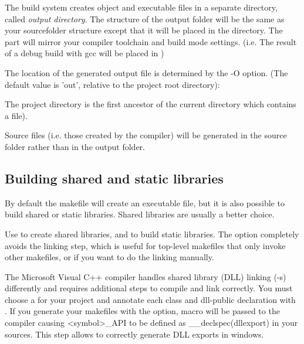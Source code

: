 The build system creates object and executable files in a separate directory, called
\textit{output directory}. The structure of the output folder will be the same as your
sourcefolder structure except that it will be placed in the  directory.
The  part will mirror your compiler toolchain and build mode settings.
(i.e. The result of a debug build with gcc will be placed in )


The location of the generated output file is determined by the -O option.
(The default value is 'out', relative to the project root directory):




\begin{note}
The project directory is the first ancestor of the current directory which
contains a  file).
\end{note}


\begin{note}
Source files (i.e. those created by the  compiler) will be generated in the
source folder rather than in the output folder.
\end{note}


\subsection{Building shared and static libraries}

By default the makefile will create an executable file, but it is also
possible to build shared or static libraries. Shared libraries
are usually a better choice.

Use  to create shared libraries, and 
to build static libraries. The  option completely avoids
the linking step, which is useful for top-level makefiles that only invoke
other makefiles, or if you want to do the linking manually.

\ifcommercial
\begin{note}
The Microsoft Visual C++ compiler handles shared library (DLL) linking (-s)
differently and requires additional steps to compile and link correctly.
You must choose a  for your project and annotate each class
and dll-public declaration with . If you generate your makefiles
with the  option,  macro will be passed to
the compiler causing <symbol>\_API to be defined as \_\_declspec(dllexport) in
your sources. This step allows to correctly generate DLL exports in windows.
\end{note}
\fi



